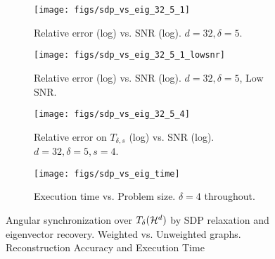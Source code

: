 \begin{figure}[hbt]
  \centering
  \begin{subfigure}[b]{.49\textwidth}
    \centering
    \texttt{[image: figs/sdp\_vs\_eig\_32\_5\_1]}
    \caption{Relative error (log) vs. SNR (log).  $d = 32, \delta = 5$.}
    \label{fig:sdp_vs_eig_32_5_1}
  \end{subfigure}
  \begin{subfigure}[b]{.49\textwidth}
    \centering
    \texttt{[image: figs/sdp\_vs\_eig\_32\_5\_1\_lowsnr]}
    \caption{Relative error (log) vs. SNR (log).  $d = 32, \delta = 5$, Low SNR.}
    \label{fig:sdp_vs_eig_32_5_1_lowsnr}
  \end{subfigure}
  \begin{subfigure}[b]{.49\textwidth}
    \centering
    \texttt{[image: figs/sdp\_vs\_eig\_32\_5\_4]}
    \caption{Relative error on $T_{\delta, s}$ (log) vs. SNR (log).  $d = 32, \delta = 5, s = 4$.}
    \label{fig:sdp_vs_eig_32_5_4}
  \end{subfigure}
  \begin{subfigure}[b]{.49\textwidth}
    \centering
    \texttt{[image: figs/sdp\_vs\_eig\_time]}
    \caption{Execution time vs. Problem size.  $\delta = 4$ throughout.}
    \label{fig:sdp_vs_eig_time}
  \end{subfigure}
  \caption{Angular synchronization over $T_\delta(\mathcal{H}^d)$ by SDP relaxation and eigenvector recovery.  Weighted vs. Unweighted graphs.  Reconstruction Accuracy and Execution Time}
  \label{fig:sdp_vs_eig}
\end{figure}

